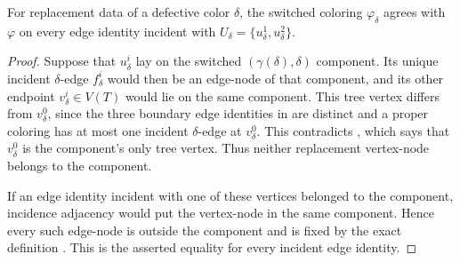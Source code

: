 \begin{lemma}
For replacement data of a defective color $\delta$, the switched coloring
$\varphi_\delta$ agrees with $\varphi$ on every edge identity incident with
$U_\delta=\{u^1_\delta,u^2_\delta\}$.
\end{lemma}
\begin{proof}
Suppose that $u^i_\delta$ lay on the switched
$(\gamma(\delta),\delta)$ component.  Its unique incident
$\delta$-edge $f^i_\delta$ would then be an edge-node of that component,
and its other endpoint $v^i_\delta\in V(T)$ would lie on the same component.
This tree vertex differs from $v^0_\delta$, since the three boundary edge
identities in  are distinct and a proper
coloring has at most one incident $\delta$-edge at $v^0_\delta$.  This
contradicts , which says that
$v^0_\delta$ is the component's only tree vertex.  Thus neither replacement
vertex-node belongs to the component.

If an edge identity incident with one of these vertices belonged to the
component, incidence adjacency would put the vertex-node in the same
component.  Hence every such edge-node is outside the component and is
fixed by the exact definition .  This is
the asserted equality for every incident edge identity.
\end{proof}
